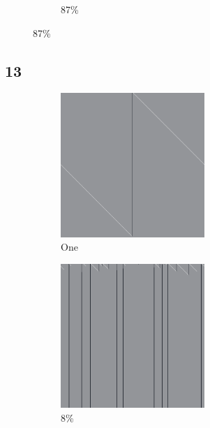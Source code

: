 \documentclass[12pt, fleqn]{report}                             %
\theoremstyle{break}                                            %
\begin{document}
\begin{figure}[ht!]
\begin{subfigure}[b]{0.4\linewidth}
          \caption{87\%}
        \end{subfigure}
      \end{figure}


      \clearpage
      \subsection{13}
      \begin{figure}[ht!]
        \centering
        \begin{subfigure}[b]{0.4\linewidth}
          \includegraphics[width=0.6\textwidth]{Images/13/a.png}
          \caption{One}
        \end{subfigure}
        \begin{subfigure}[b]{0.4\linewidth}
          \includegraphics[width=0.6\textwidth]{Images/13/b.png}
          \caption{8\%}
        \end{subfigure}
        \begin{subfigure}[b]{0.4\linewidth}

\end{subfigure}
\end{figure}
\end{document}
